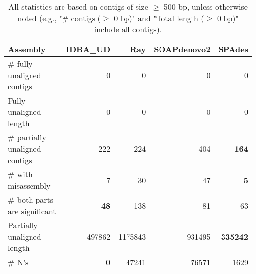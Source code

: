 \documentclass[12pt,a4paper]{article}
\begin{document}
\begin{table}[ht]
\begin{center}
\caption{All statistics are based on contigs of size $\geq$ 500 bp, unless otherwise noted (e.g., "\# contigs ($\geq$ 0 bp)" and "Total length ($\geq$ 0 bp)" include all contigs).}
\begin{tabular}{|l*{4}{|r}|}
\hline
Assembly & IDBA\_UD & Ray & SOAPdenovo2 & SPAdes \\ \hline
\# fully unaligned contigs & 0 & 0 & 0 & 0 \\ \hline
Fully unaligned length & 0 & 0 & 0 & 0 \\ \hline
\# partially unaligned contigs & 222 & 224 & 404 & {\bf 164} \\ \hline
\hspace{5mm}\# with misassembly & 7 & 30 & 47 & {\bf 5} \\ \hline
\hspace{5mm}\# both parts are significant & {\bf 48} & 138 & 81 & 63 \\ \hline
Partially unaligned length & 497862 & 1175843 & 931495 & {\bf 335242} \\ \hline
\# N's & {\bf 0} & 47241 & 76571 & 1629 \\ \hline
\end{tabular}
\end{center}
\end{table}
\end{document}
